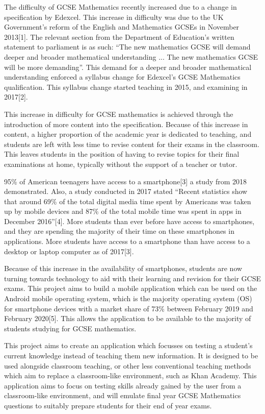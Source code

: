 \documentclass{article}
\begin{document}
The difficulty of GCSE Mathematics recently increased due to a change in specification by Edexcel. This increase in difficulty was due to the UK Government's reform of the English and Mathematics GCSEs in November 2013[1]. The relevant section from the Department of Education's written statement to parliament is as such: ``The new mathematics GCSE will demand deeper and broader mathematical understanding ...  The new mathematics GCSE will be more demanding''. This demand for a deeper and broader mathematical understanding enforced a syllabus change for Edexcel's GCSE Mathematics qualification. This syllabus change started teaching in 2015, and examining in 2017[2]. \par

This increase in difficulty for GCSE mathematics is achieved through the introduction of more content into the specification. Because of this increase in content, a higher proportion of the academic year is dedicated to teaching, and students are left with less time to revise content for their exams in the classroom. This leaves students in the position of having to revise topics for their final examinations at home, typically without the support of a teacher or tutor. \par

95\% of American teenagers have access to a smartphone[3] a study from 2018 demonstrated. Also, a study conducted in 2017 stated ``Recent statistics show that around 69\% of the total digital media time spent by Americans was taken up by mobile devices and 87\% of the total mobile time was spent in apps in December 2016''[4]. More students than ever before have access to smartphones, and they are spending the majority of their time on these smartphones in applications. More students have access to a smartphone than have access to a desktop or laptop computer as of 2017[3]. \par

Because of this increase in the availability of smartphones, students are now turning towards technology to aid with their learning and revision for their GCSE exams. This project aims to build a mobile application which can be used on the Android mobile operating system, which is the majority operating system (OS) for smartphone devices with a market share of 73\% between February 2019 and February 2020[5]. This allows the application to be available to the majority of students studying for GCSE mathematics. \par

This project aims to create an application which focusses on testing a student's current knowledge instead of teaching them new information. It is designed to be used alongside classroom teaching, or other less conventional teaching methods which aim to replace a classroom-like environment, such as Khan Academy. This application aims to focus on testing skills already gained by the user from a classroom-like environment, and will emulate final year GCSE Mathematics questions to suitably prepare students for their end of year exams. \par
\end{document}
